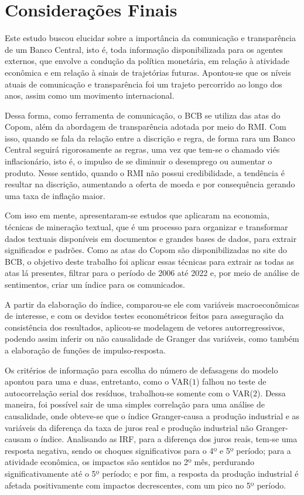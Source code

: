 
\chapter{Considerações Finais}

Este estudo buscou elucidar sobre a importância da comunicação e transparência de um Banco Central, isto é, toda informação disponibilizada para os agentes externos, que envolve a condução da política monetária, em relação à atividade econômica e em relação à sinais de trajetórias futuras. Apontou-se que os níveis atuais de comunicação e transparência foi um trajeto percorrido ao longo dos anos, assim como um movimento internacional.

Dessa forma, como ferramenta de comunicação, o BCB se utiliza das atas do Copom, além da abordagem de transparência adotada por meio do RMI. Com isso, quando se fala da relação entre a discrição e regra, de forma rara um Banco Central seguirá rigorosamente as regras, uma vez que tem-se o chamado viés inflacionário, isto é, o impulso de se diminuir o desemprego ou aumentar o produto. Nesse sentido, quando o RMI não possui credibilidade, a tendência é resultar na discrição, aumentando a oferta de moeda e por consequência gerando uma taxa de inflação maior.

Com isso em mente, apresentaram-se estudos que aplicaram na economia, técnicas de mineração textual, que é um processo para organizar e transformar dados textuais disponíveis em documentos e grandes bases de dados, para extrair significados e padrões. Como as atas do Copom são disponibilizadas no site do BCB, o objetivo deste trabalho foi aplicar essas técnicas para extrair as todas as atas lá presentes, filtrar para o período de 2006 até 2022 e, por meio de análise de sentimentos, criar um índice para os comunicados.

A partir da elaboração do índice, comparou-se ele com variáveis macroeconômicas de interesse, e com os devidos testes econométricos feitos para asseguração da consistência dos resultados, aplicou-se modelagem de vetores autorregressivos, podendo assim inferir ou não causalidade de Granger das variáveis, como também a elaboração de funções de impulso-resposta.

Os critérios de informação para escolha do número de defasagens do modelo apontou para uma e duas, entretanto, como o VAR($1$) falhou no teste de autocorrelação serial dos resíduos, trabalhou-se somente com o VAR($2$). Dessa maneira, foi possível sair de uma simples correlação para uma análise de causalidade, onde obteve-se que o índice Granger-causa a produção industrial e as variáveis da diferença da taxa de juros real e produção industrial não Granger-causam o índice. Analisando as IRF, para a diferença dos juros reais, tem-se uma resposta negativa, sendo os choques significativos para o 4º e 5º período; para a atividade econômica, os impactos são sentidos no 2º mês, perdurando significativamente até o 5º período; e por fim, a resposta da produção industrial é afetada positivamente com impactos decrescentes, com um pico no 5º período.

